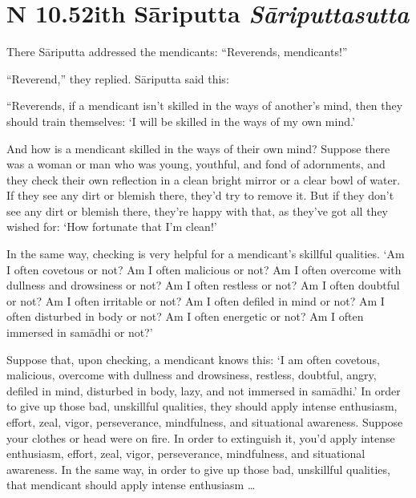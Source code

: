 \documentclass[12pt,openany]{book}%
\newcommand*{\suttatitleacronym}[1]{\smaller[2]{#1}\vspace*{.3em}}
\newcommand*{\suttatitletranslation}[1]{\linebreak{#1}}
\newcommand*{\suttatitleroot}[1]{\linebreak\smaller[2]\itshape{#1}}
\newcommand*{\tocacronym}[1]{\hspace*{-3.3em}{#1}\quad}
\newcommand*{\toctranslation}[1]{#1}
\newcommand*{\tocroot}[1]{(\textit{#1})}
\begin{document}
%
\section*{{\suttatitleacronym AN 10.52}{\suttatitletranslation With Sāriputta }{\suttatitleroot Sāriputtasutta}}
\addcontentsline{toc}{section}{\tocacronym{AN 10.52} \toctranslation{With Sāriputta } \tocroot{Sāriputtasutta}}

There \textsanskrit{Sāriputta} addressed the mendicants: “Reverends, mendicants!” 

“Reverend,” they replied. \textsanskrit{Sāriputta} said this: 

“Reverends, if a mendicant isn’t skilled in the ways of another’s mind, then they should train themselves: ‘I will be skilled in the ways of my own mind.’ 

And how is a mendicant skilled in the ways of their own mind? Suppose there was a woman or man who was young, youthful, and fond of adornments, and they check their own reflection in a clean bright mirror or a clear bowl of water. If they see any dirt or blemish there, they’d try to remove it. But if they don’t see any dirt or blemish there, they’re happy with that, as they’ve got all they wished for: ‘How fortunate that I’m clean!’ 

In the same way, checking is very helpful for a mendicant’s skillful qualities. ‘Am I often covetous or not? Am I often malicious or not? Am I often overcome with dullness and drowsiness or not? Am I often restless or not? Am I often doubtful or not? Am I often irritable or not? Am I often defiled in mind or not? Am I often disturbed in body or not? Am I often energetic or not? Am I often immersed in \textsanskrit{samādhi} or not?’ 

Suppose that, upon checking, a mendicant knows this: ‘I am often covetous, malicious, overcome with dullness and drowsiness, restless, doubtful, angry, defiled in mind, disturbed in body, lazy, and not immersed in \textsanskrit{samādhi}.’ In order to give up those bad, unskillful qualities, they should apply intense enthusiasm, effort, zeal, vigor, perseverance, mindfulness, and situational awareness. Suppose your clothes or head were on fire. In order to extinguish it, you’d apply intense enthusiasm, effort, zeal, vigor, perseverance, mindfulness, and situational awareness. In the same way, in order to give up those bad, unskillful qualities, that mendicant should apply intense enthusiasm … 
\end{document}
